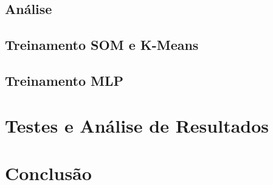 \documentclass[
	12pt,				%
	openright,			%
	twoside,			%
	a4paper,			%
	english,			%
	french,				%
	spanish,			%
	brazil				%
	]{abntex2}
\begin{document}
\section{Análise}
\section{Treinamento SOM e K-Means}
\section{Treinamento MLP}
\chapter{Testes e Análise de Resultados}
\chapter{Conclusão}
\postextual


%
%



\partapendices


\printindex
\end{document}
